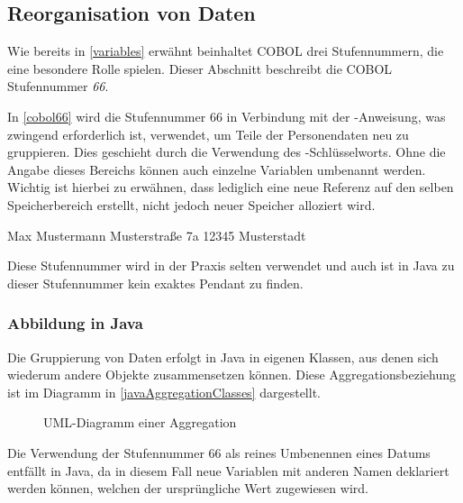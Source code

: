 \subsection{Reorganisation von Daten}
Wie bereits in \autoref{variables} erwähnt beinhaltet COBOL drei Stufennummern, die eine besondere Rolle spielen. Dieser Abschnitt beschreibt die COBOL Stufennummer \textit{66}.

In \autoref{cobol66} wird die Stufennummer 66 in Verbindung mit der -Anweisung, was zwingend erforderlich ist, verwendet, um Teile der Personendaten neu zu gruppieren. Dies geschieht durch die Verwendung des -Schlüsselworts. Ohne die Angabe dieses Bereichs können auch einzelne Variablen umbenannt werden. Wichtig ist hierbei zu erwähnen, dass lediglich eine neue Referenz auf den selben Speicherbereich erstellt, nicht jedoch neuer Speicher alloziert wird.
\begin{shellwindow}
Max       Mustermann
Musterstraße  7a   12345 Musterstadt   
\end{shellwindow}
Diese Stufennummer wird in der Praxis selten verwendet und auch ist in Java zu dieser Stufennummer kein exaktes Pendant zu finden. 
\subsubsection*{Abbildung in Java}
Die Gruppierung von Daten erfolgt in Java in eigenen Klassen, aus denen sich wiederum andere Objekte zusammensetzen können. Diese Aggregationsbeziehung ist im Diagramm in \autoref{javaAggregationClasses} dargestellt. 

\begin{figure}[H]
    \centering
    \caption{UML-Diagramm einer Aggregation}
    \label{javaAggregationClasses}
\end{figure}
Die Verwendung der Stufennummer 66 als reines Umbenennen eines Datums entfällt in Java, da in diesem Fall neue Variablen mit anderen Namen deklariert werden können, welchen der ursprüngliche Wert zugewiesen wird.
